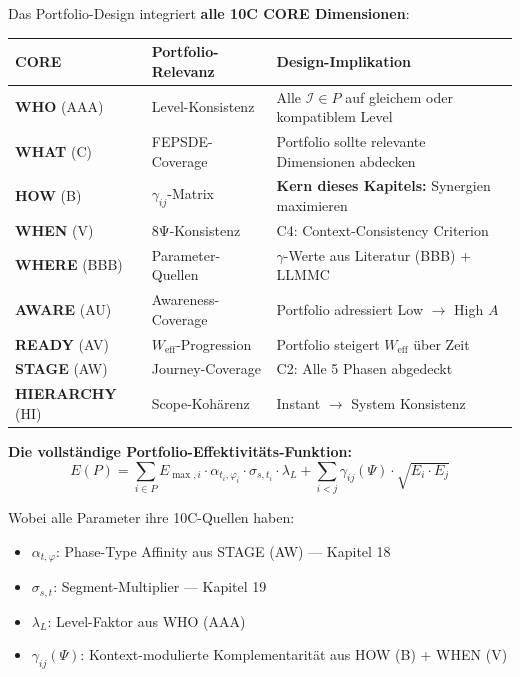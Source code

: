 \begin{tcolorbox}[colback=purple!5!white, colframe=purple!75!black,
    title=\textbf{10C CORE Integration: Portfolios und alle 9 Dimensionen}]

Das Portfolio-Design integriert \textbf{alle 10C CORE Dimensionen}:

\begin{center}
\renewcommand{\arraystretch}{1.2}
\footnotesize
\begin{tabular}{@{}llp{6cm}@{}}
\toprule
\textbf{CORE} & \textbf{Portfolio-Relevanz} & \textbf{Design-Implikation} \\
\midrule
\textbf{WHO} (AAA) & Level-Konsistenz & Alle $\mathcal{I} \in P$ auf gleichem oder kompatiblem Level \\
\textbf{WHAT} (C) & FEPSDE-Coverage & Portfolio sollte relevante Dimensionen abdecken \\
\textbf{HOW} (B) & $\gamma_{ij}$-Matrix & \textbf{Kern dieses Kapitels:} Synergien maximieren \\
\textbf{WHEN} (V) & 8Ψ-Konsistenz & C4: Context-Consistency Criterion \\
\textbf{WHERE} (BBB) & Parameter-Quellen & $\gamma$-Werte aus Literatur (BBB) + LLMMC \\
\textbf{AWARE} (AU) & Awareness-Coverage & Portfolio adressiert Low $\rightarrow$ High $A$ \\
\textbf{READY} (AV) & $W_{\text{eff}}$-Progression & Portfolio steigert $W_{\text{eff}}$ über Zeit \\
\textbf{STAGE} (AW) & Journey-Coverage & C2: Alle 5 Phasen abgedeckt \\
\textbf{HIERARCHY} (HI) & Scope-Kohärenz & Instant $\rightarrow$ System Konsistenz \\
\bottomrule
\end{tabular}
\end{center}

\textbf{Die vollständige Portfolio-Effektivitäts-Funktion:}
\begin{equation}
\boxed{E(P) = \sum_{i \in P} E_{\max,i} \cdot \alpha_{t_i,\varphi_i} \cdot \sigma_{s,t_i} \cdot \lambda_{L} + \sum_{i < j} \gamma_{ij}(\Psi) \cdot \sqrt{E_i \cdot E_j}}
\end{equation}

Wobei alle Parameter ihre 10C-Quellen haben:
\begin{itemize}[nosep]
\item $\alpha_{t,\varphi}$: Phase-Type Affinity aus STAGE (AW) --- Kapitel 18
\item $\sigma_{s,t}$: Segment-Multiplier --- Kapitel 19
\item $\lambda_L$: Level-Faktor aus WHO (AAA)
\item $\gamma_{ij}(\Psi)$: Kontext-modulierte Komplementarität aus HOW (B) + WHEN (V)
\end{itemize}

\end{tcolorbox}

